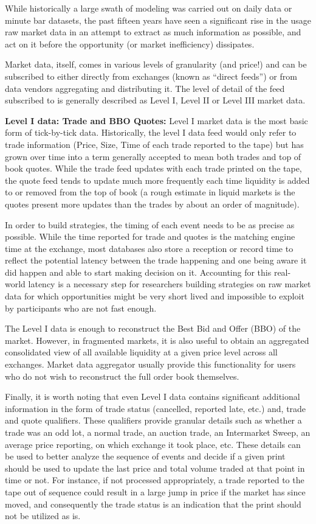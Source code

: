 While historically a large swath of modeling was carried out on daily data or minute bar datasets, the past fifteen years have seen a significant rise in the usage raw market data in an attempt to extract as much information as possible, and act on it before the opportunity (or market inefficiency) dissipates.

Market data, itself, comes in various levels of granularity (and price!) and can be subscribed to either directly from exchanges (known as ``direct feeds'') or from data vendors aggregating and distributing it. The level of detail of the feed subscribed to is generally described as Level I, Level II or Level III market data.\twomedskip


\noindent\textbf{Level I data: Trade and BBO Quotes:} Level I market data is the most basic form of tick-by-tick data. Historically, the level I data feed would only refer to trade information (Price, Size, Time of each trade reported to the tape) but has grown over time into a term generally accepted to mean both trades and top of book quotes. While the trade feed updates with each trade printed on the tape, the quote feed tends to update much more frequently each time liquidity is added to or removed from the top of book (a rough estimate in liquid markets is the quotes present more updates than the trades by about an order of magnitude). 


In order to build strategies, the timing of each event needs to be as precise as possible. While the time reported for trade and quotes is the matching engine time at the exchange, most databases also store a reception or record time to reflect the potential latency between the trade happening and one being aware it did happen and able to start making decision on it. Accounting for this real-world latency is a necessary step for researchers building strategies on raw market data for which opportunities might be very short lived and impossible to exploit by participants who are not fast enough.


The Level I data is enough to reconstruct the Best Bid and Offer (BBO) of the market. However, in fragmented markets, it is also useful to obtain an aggregated consolidated view of all available liquidity at a given price level across all exchanges. Market data aggregator usually provide this functionality for users who do not wish to reconstruct the full order book themselves. 


Finally, it is worth noting that even Level I data contains significant additional information in the form of trade status (cancelled, reported late, etc.) and, trade and quote qualifiers. These qualifiers provide granular details such as whether a trade was an odd lot, a normal trade, an auction trade, an Intermarket Sweep, an average price reporting, on which exchange it took place, etc. These details can be used to better analyze the sequence of events and decide if a given print should be used to update the last price and total volume traded at that point in time or not. For instance, if not processed appropriately, a trade reported to the tape out of sequence could result in a large jump in price if the market has since moved, and consequently the trade status is an indication that the print should not be utilized as is.


